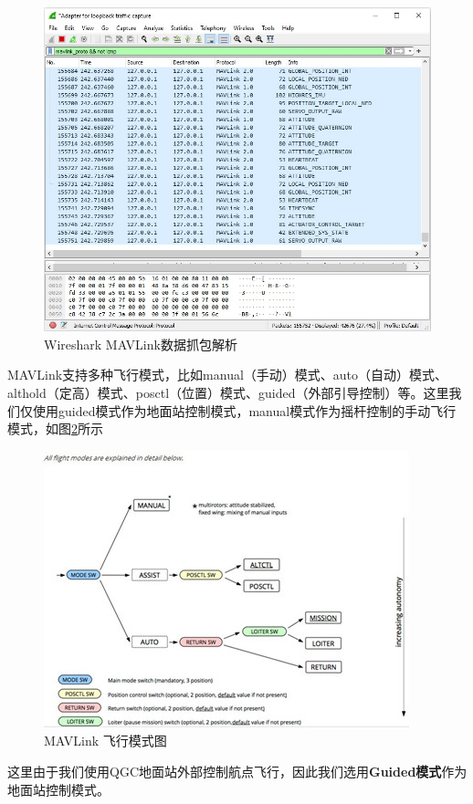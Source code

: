\begin{figure}[ht]
  \centering
  \includegraphics[width=0.8\linewidth]{./Figure/Mavlink_Wireshark_Decode.jpg}
  \caption{Wireshark MAVLink数据抓包解析}\label{Fig:img11}
\end{figure}

MAVLink支持多种飞行模式，比如manual（手动）模式、auto（自动）模式、althold（定高）模式、posctl（位置）模式、guided（外部引导控制）等。这里我们仅使用guided模式作为地面站控制模式，manual模式作为摇杆控制的手动飞行模式，如图\ref{Fig:img12}所示

\begin{figure}[ht]
  \centering
  \includegraphics[width=0.8\linewidth]{./Figure/Flight_Mode.png}
  \caption{MAVLink 飞行模式图}\label{Fig:img12}
\end{figure}

这里由于我们使用QGC地面站外部控制航点飞行，因此我们选用\textbf{Guided模式}作为地面站控制模式。

